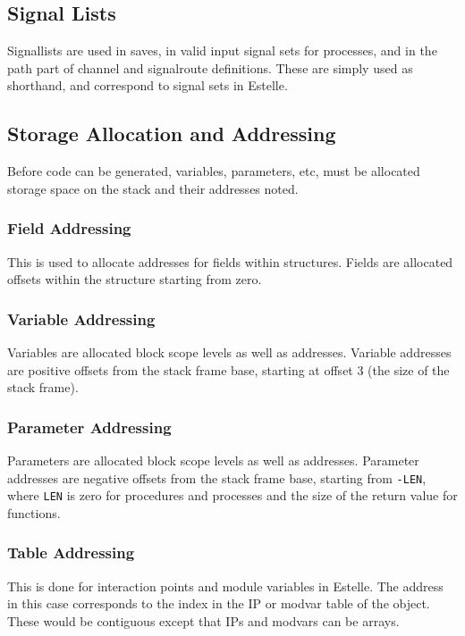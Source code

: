 \subsection{Signal Lists}

Signallists are used in saves, in valid input signal sets for
processes, and in the path part of channel and signalroute definitions.
These are simply used as shorthand, and correspond to signal sets in
Estelle.

\subsection{Storage Allocation and Addressing}

Before code can be generated, variables, parameters, etc,
must be allocated storage space on the stack and their addresses
noted.

\subsubsection{Field Addressing}

This is used to allocate addresses for fields within structures.
Fields are allocated offsets within the structure starting from zero.

\subsubsection{Variable Addressing}

Variables are allocated block scope levels as well as addresses.
Variable addresses are positive offsets from the stack frame base,
starting at offset 3 (the size of the stack frame).

\subsubsection{Parameter Addressing}

Parameters are allocated block scope levels as well as addresses.
Parameter addresses are negative offsets from the stack frame base,
starting from {\tt -LEN}, where {\tt LEN} is zero for procedures and
processes and the size of the return value for functions.

\subsubsection{Table Addressing}

This is done for interaction points and module variables in Estelle.
The address in this case corresponds to the index in the IP or modvar
table of the object. These would be contiguous except that IPs and
modvars can be arrays.

